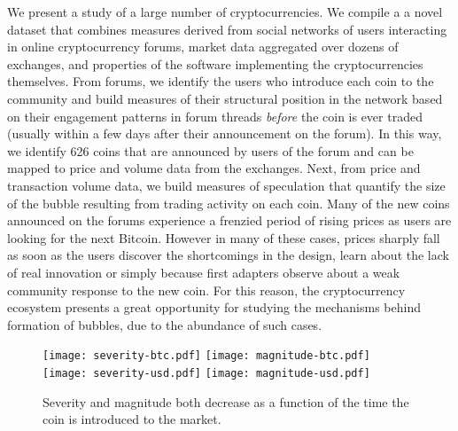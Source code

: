 We present a study of a large number of cryptocurrencies.
We compile a a novel dataset that combines measures derived from social networks of users interacting in online cryptocurrency forums, market data aggregated over dozens of exchanges, and properties of the software implementing the cryptocurrencies themselves.
From forums, we identify the users who introduce each coin to the community and build measures of their structural position in the network based on
their engagement patterns in forum threads \emph{before} the coin is ever traded (usually within a few days after their announcement on the forum).
In this way, we identify 626 coins that are announced by users of the forum and can be mapped to price and volume data from the exchanges.
Next, from price and transaction volume data, we build measures of speculation that quantify the size of the bubble resulting from trading activity on each coin. 
Many of the new coins announced on the forums experience a frenzied period of rising prices as users are looking for the next Bitcoin. However in many of these cases, prices sharply fall as soon as the users discover the shortcomings in the design, learn about the lack of real innovation or simply because first adapters observe about a weak community response to the new coin. For this reason, the cryptocurrency ecosystem presents a great opportunity for studying the mechanisms behind formation of bubbles, due to the abundance of such cases.


\begin{figure}
\centering
\texttt{[image: severity-btc.pdf]}
\texttt{[image: magnitude-btc.pdf]}
\texttt{[image: severity-usd.pdf]}
\texttt{[image: magnitude-usd.pdf]}
\caption{Severity and magnitude both decrease as a function of the time the coin is introduced to the market.}
\label{severity_boxplot}
\end{figure}

